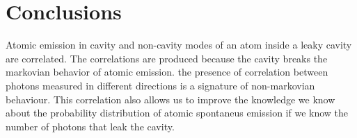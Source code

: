 \documentclass[%
 reprint,
 amsmath,amssymb,
 aps, 
]{revtex4-2}
\begin{document}



\section{Conclusions}\label{sc:conclusions}
Atomic emission in cavity and non-cavity modes of an atom inside a
leaky cavity are correlated. The correlations are produced because the
cavity breaks the markovian behavior of atomic emission. the presence
of correlation between photons measured in different directions is a
signature of non-markovian behaviour. This correlation also allows us
to improve the knowledge we know about the probability distribution of
atomic spontaneus emission if we know the number of photons that leak
the cavity. 





\end{document}
